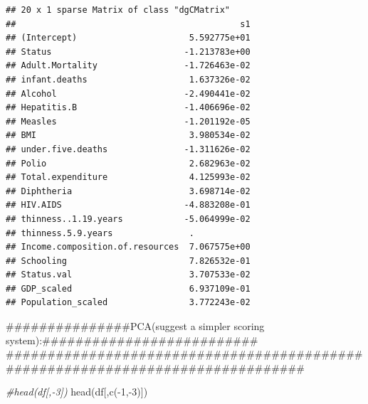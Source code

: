 \documentclass[
]{article}
\newenvironment{Shaded}{\begin{snugshade}}{\end{snugshade}}
\newcommand{\CommentTok}[1]{\textcolor[rgb]{0.56,0.35,0.01}{\textit{#1}}}
\newcommand{\DecValTok}[1]{\textcolor[rgb]{0.00,0.00,0.81}{#1}}
\newcommand{\FunctionTok}[1]{\textcolor[rgb]{0.00,0.00,0.00}{#1}}
\newcommand{\NormalTok}[1]{#1}
\newcommand{\SpecialCharTok}[1]{\textcolor[rgb]{0.00,0.00,0.00}{#1}}
\begin{document}
\begin{verbatim}
## 20 x 1 sparse Matrix of class "dgCMatrix"
##                                            s1
## (Intercept)                      5.592775e+01
## Status                          -1.213783e+00
## Adult.Mortality                 -1.726463e-02
## infant.deaths                    1.637326e-02
## Alcohol                         -2.490441e-02
## Hepatitis.B                     -1.406696e-02
## Measles                         -1.201192e-05
## BMI                              3.980534e-02
## under.five.deaths               -1.311626e-02
## Polio                            2.682963e-02
## Total.expenditure                4.125993e-02
## Diphtheria                       3.698714e-02
## HIV.AIDS                        -4.883208e-01
## thinness..1.19.years            -5.064999e-02
## thinness.5.9.years               .           
## Income.composition.of.resources  7.067575e+00
## Schooling                        7.826532e-01
## Status.val                       3.707533e-02
## GDP_scaled                       6.937109e-01
## Population_scaled                3.772243e-02
\end{verbatim}

\#\#\#\#\#\#\#\#\#\#\#\#\#\#\#PCA(suggest a simpler scoring
system):\#\#\#\#\#\#\#\#\#\#\#\#\#\#\#\#\#\#\#\#\#\#\#\#\#\#
\#\#\#\#\#\#\#\#\#\#\#\#\#\#\#\#\#\#\#\#\#\#\#\#\#\#\#\#\#\#\#\#\#\#\#\#\#\#\#\#\#\#\#\#\#\#\#\#\#\#\#\#\#\#\#\#\#\#\#\#\#\#\#\#\#\#\#\#\#\#\#\#\#\#\#\#\#\#\#

\begin{Shaded}
\begin{Highlighting}[]
\CommentTok{\#head(df[,{-}3])}
\FunctionTok{head}\NormalTok{(df[,}\FunctionTok{c}\NormalTok{(}\SpecialCharTok{{-}}\DecValTok{1}\NormalTok{,}\SpecialCharTok{{-}}\DecValTok{3}\NormalTok{)])}
\end{Highlighting}
\end{Shaded}
\end{document}
